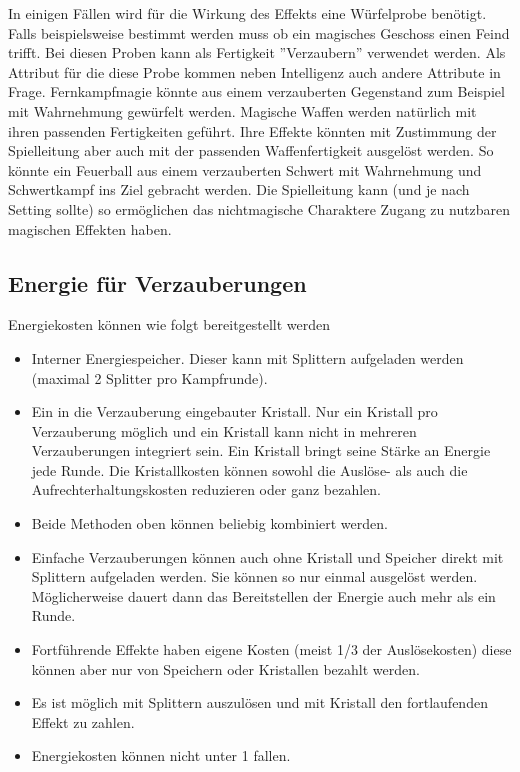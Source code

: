 \documentclass{article}
\begin{document}
In einigen Fällen wird für die Wirkung des Effekts eine Würfelprobe benötigt. Falls beispielsweise bestimmt werden
muss ob ein magisches Geschoss einen Feind trifft. Bei diesen Proben kann als Fertigkeit ''Verzaubern'' verwendet werden.
Als Attribut für die diese Probe kommen neben Intelligenz auch andere Attribute in Frage. Fernkampfmagie könnte aus
einem verzauberten Gegenstand zum Beispiel mit Wahrnehmung gewürfelt werden.
Magische Waffen werden natürlich mit ihren passenden Fertigkeiten geführt. Ihre Effekte könnten mit Zustimmung der
Spielleitung aber auch mit der passenden Waffenfertigkeit ausgelöst werden. So könnte ein Feuerball aus einem
verzauberten Schwert mit Wahrnehmung und Schwertkampf ins Ziel gebracht werden. Die Spielleitung kann (und je nach
Setting sollte) so ermöglichen das nichtmagische Charaktere Zugang zu nutzbaren magischen Effekten haben.

\begin{center}
\subsection{Energie für Verzauberungen}
\end{center}

Energiekosten können wie folgt bereitgestellt werden

\begin{itemize}
\item Interner Energiespeicher. Dieser kann mit Splittern aufgeladen werden (maximal 2 Splitter pro Kampfrunde).
\item Ein in die Verzauberung eingebauter Kristall. Nur ein Kristall pro Verzauberung möglich und ein Kristall kann nicht in mehreren Verzauberungen integriert sein. Ein Kristall bringt seine Stärke an Energie jede Runde. Die Kristallkosten können sowohl die Auslöse- als auch die Aufrechterhaltungskosten reduzieren oder ganz bezahlen.
\item Beide Methoden oben können beliebig kombiniert werden.
\item Einfache Verzauberungen können auch ohne Kristall und Speicher direkt mit Splittern aufgeladen werden. Sie können so nur einmal ausgelöst werden. Möglicherweise dauert dann das Bereitstellen der Energie auch mehr als ein Runde.
\item Fortführende Effekte haben eigene Kosten (meist 1/3 der Auslösekosten) diese können aber nur von Speichern oder Kristallen bezahlt werden.
\item Es ist möglich mit Splittern auszulösen und mit Kristall den fortlaufenden Effekt zu zahlen.
\item Energiekosten können nicht unter 1 fallen.
\end{itemize}
\end{document}
